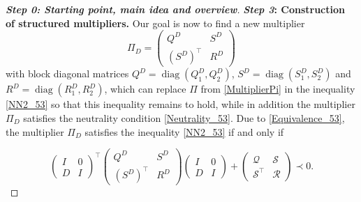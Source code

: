 \documentclass[11pt,a4paper,oneside,DIV=12,headings=small]{scrartcl}
\newcommand{\cS}{\mathcal{S}}
\newcommand{\cQ}{\mathcal{Q}}
\newcommand{\cR}{\mathcal{R}}
\newcommand{\diag}{\operatorname{diag}}
\theoremstyle{plain}
\begin{document}
\begin{proof}[\textbf{Step 0: \emph{Starting point, main idea and overview}}]
\textbf{\emph{Step 3}: Construction of structured multipliers.} \newline
Our goal is now to find a new multiplier 
\begin{equation}
\label{MultiplierPiNew}
\Pi_D=\begin{pmatrix} Q^D & S^D \\ (S^D)^\top & R^D \end{pmatrix}
\end{equation}
 with block diagonal matrices $Q^D=\diag(Q^D_1,Q^D_2)$, $S^D=\diag(S^D_1,S^D_2)$ and $R^D=\diag(R^D_1,R^D_2)$, which can replace $\Pi$ from \eqref{MultiplierPi}  in the inequality \eqref{NN2_53} so that this inequality remains to hold, while in addition the multiplier $\Pi_D$ satisfies the neutrality condition \eqref{Neutrality_53}.
Due to \eqref{Equivalence_53}, the multiplier $\Pi_D$ satisfies the inequality \eqref{NN2_53} if and only if

\begin{equation}
\label{Goal1a}
\begin{pmatrix} I & 0 \\ D & I \end{pmatrix}^\top
\begin{pmatrix} Q^D & S^D \\ (S^D)^\top & R^D \end{pmatrix}
\begin{pmatrix} I & 0 \\ D & I \end{pmatrix}
+
\begin{pmatrix} \cQ & \cS \\ \cS^\top & \cR \end{pmatrix}
\prec 0.
\end{equation}


\end{proof}
\end{document}

